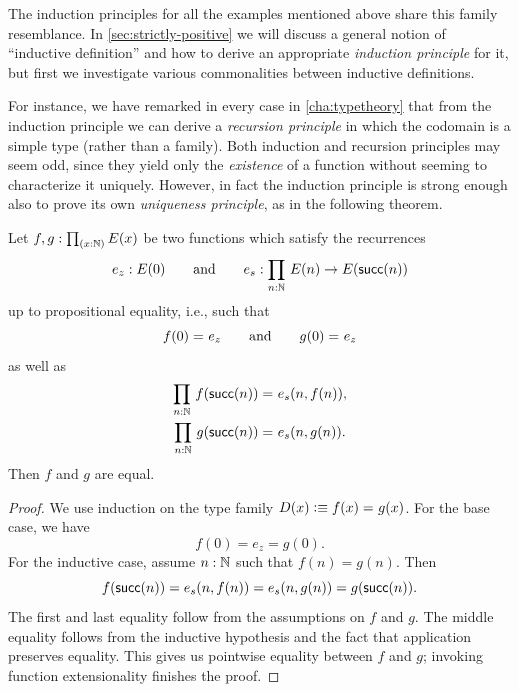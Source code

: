 The induction principles for all the examples mentioned above share this family resemblance.
In \cref{sec:strictly-positive} we will discuss a general notion of ``inductive definition'' and how to derive an appropriate \emph{induction principle} for it, but first we investigate various commonalities between inductive definitions.

%
For instance, we have remarked in every case in \cref{cha:typetheory} that from the induction principle we can derive a \emph{recursion principle} in which the codomain is a simple type (rather than a family).
Both induction and recursion principles may seem odd, since they yield only the \emph{existence} of a function without seeming to characterize it uniquely.
However, in fact the induction principle is strong enough also to prove its own \emph{uniqueness principle}, as in the following theorem.

\begin{thm}\label{thm:nat-uniq}
Let $f,g : \prd{x:\nat} E(x)$ be two functions which satisfy the recurrences
%
\begin{equation*}
  e_z : E(0)
  \qquad\text{and}\qquad
  e_s : \prd{n : \nat} E(n) \to E(\suc(n))
\end{equation*}
%
up to propositional equality, i.e., such that
\begin{equation*}
  f(0) =_{} e_z
  \qquad\text{and}\qquad
  g(0) =_{} e_z
\end{equation*}
as well as
\begin{gather*}
  \prd{n : \nat} \id{f(\suc(n))}{e_s(n, f(n))},\\
  \prd{n : \nat} \id{g(\suc(n))}{e_s(n, g(n))}.
\end{gather*}
Then $f$ and $g$ are equal.
\end{thm}

\begin{proof}
We use induction on the type family $D(x) \vcentcolon\equiv f(x) =_{} g(x)$. For the base case, we have
\[ f(0) = e_z = g(0). \]
For the inductive case, assume $n : \mathbb{N}$ such that $f(n) = g(n)$. Then
\[ f(\mathsf{succ}(n)) = e_s(n, f(n)) = e_s(n, g(n)) = g(\mathsf{succ}(n)). \]
The first and last equality follow from the assumptions on $f$ and $g$. The middle equality follows from the inductive hypothesis and the fact that application preserves equality. This gives us pointwise equality between $f$ and $g$; invoking function extensionality finishes the proof.
\end{proof}

